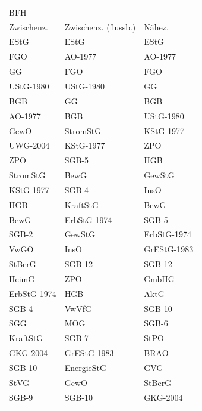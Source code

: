 \begin{tabular}{lll}
\toprule
\multicolumn{4}{l}{BFH} \\
 Zwischenz. & Zwischenz. (flussb.) &      Nähez. \\
\midrule
       EStG &                 EStG &        EStG \\
        FGO &              AO-1977 &     AO-1977 \\
         GG &                  FGO &         FGO \\
  UStG-1980 &            UStG-1980 &          GG \\
        BGB &                   GG &         BGB \\
    AO-1977 &                  BGB &   UStG-1980 \\
       GewO &             StromStG &   KStG-1977 \\
   UWG-2004 &            KStG-1977 &         ZPO \\
        ZPO &                SGB-5 &         HGB \\
   StromStG &                 BewG &      GewStG \\
  KStG-1977 &                SGB-4 &        InsO \\
        HGB &             KraftStG &        BewG \\
       BewG &          ErbStG-1974 &       SGB-5 \\
      SGB-2 &               GewStG & ErbStG-1974 \\
       VwGO &                 InsO & GrEStG-1983 \\
     StBerG &               SGB-12 &      SGB-12 \\
      HeimG &                  ZPO &       GmbHG \\
ErbStG-1974 &                  HGB &        AktG \\
      SGB-4 &                VwVfG &      SGB-10 \\
        SGG &                  MOG &       SGB-6 \\
   KraftStG &                SGB-7 &        StPO \\
   GKG-2004 &          GrEStG-1983 &        BRAO \\
     SGB-10 &           EnergieStG &         GVG \\
       StVG &                 GewO &      StBerG \\
      SGB-9 &               SGB-10 &    GKG-2004 \\
\bottomrule
\end{tabular}

